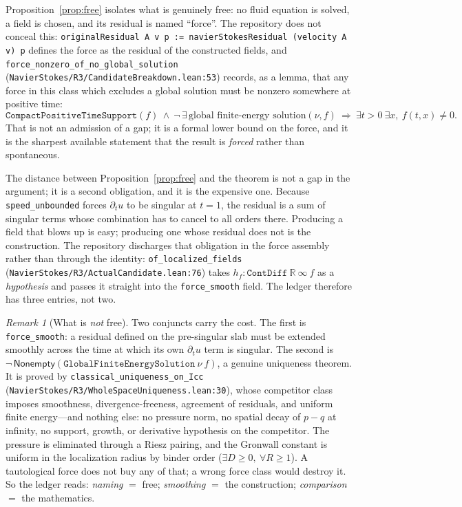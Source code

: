 \documentclass[11pt]{article}
\newcommand{\R}{\mathbb{R}}
\newcommand{\ct}[1]{\texttt{#1}}
\newcommand{\file}[1]{\texttt{\small #1}}
\theoremstyle{plain}
\theoremstyle{definition}
\theoremstyle{remark}
\newtheorem{remark}[theorem]{Remark}
\begin{document}
Proposition~\ref{prop:free} isolates what is genuinely free: no fluid equation
is solved, a field is chosen, and its residual is named ``force''. The
repository does not conceal this: \ct{originalResidual A v p := navierStokesResidual
(velocity A v) p} defines the force as the residual of the constructed fields,
and \ct{force\_nonzero\_of\_no\_global\_solution}
(\file{NavierStokes/R3/CandidateBreakdown.lean:53}) records, as a lemma, that
any force in this class which excludes a global solution must be nonzero
somewhere at positive time:
\[
  \ct{CompactPositiveTimeSupport}(f)\ \wedge\
  \neg\,\exists\,\text{global finite-energy solution}(\nu,f)
  \ \Longrightarrow\
  \exists t>0\ \exists x,\ f(t,x)\neq0 .
\]
That is not an admission of a gap; it is a formal lower bound on the force,
and it is the sharpest available statement that the result is \emph{forced}
rather than spontaneous.

The distance between Proposition~\ref{prop:free} and the theorem is not a gap in
the argument; it is a second obligation, and it is the expensive one. Because
\ct{speed\_unbounded} forces $\partial_t u$ to be singular at $t=1$, the residual
is a sum of singular terms whose combination has to cancel to all orders there.
Producing a field that blows up is easy; producing one whose residual does not
is the construction. The repository discharges that obligation in the force
assembly rather than through the identity: \ct{of\_localized\_fields}
(\file{NavierStokes/R3/ActualCandidate.lean:76}) takes
$h_f:\ct{ContDiff}\ \R\ \infty\ f$ as a \emph{hypothesis} and passes it
straight into the \ct{force\_smooth} field. The ledger therefore has three
entries, not two.

\begin{remark}[What is \emph{not} free]
\label{rem:notfree}
Two conjuncts carry the cost. The first is \ct{force\_smooth}: a residual
defined on the pre-singular slab must be extended smoothly across the time at
which its own $\partial_t u$ term is singular. The second is
$\neg\,\mathsf{Nonempty}(\ct{GlobalFiniteEnergySolution}\ \nu\ f)$, a genuine
uniqueness theorem. It is proved by
\ct{classical\_uniqueness\_on\_Icc} (\file{NavierStokes/R3/WholeSpaceUniqueness.lean:30}),
whose competitor class imposes smoothness, divergence-freeness, agreement of
residuals, and uniform finite energy---and nothing else: no pressure norm, no
spatial decay of $p-q$ at infinity, no support, growth, or derivative
hypothesis on the competitor. The pressure is eliminated through a Riesz
pairing, and the Gronwall constant is uniform in the localization radius by
binder order ($\exists D\ge0,\ \forall R\ge1$). A tautological force does not
buy any of that; a wrong force class would destroy it. So the ledger reads:
\emph{naming} $=$ free; \emph{smoothing} $=$ the construction;
\emph{comparison} $=$ the mathematics.
\end{remark}
\end{document}
